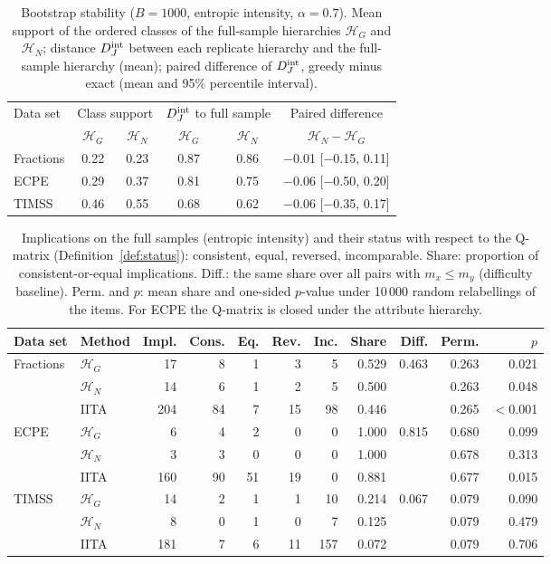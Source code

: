 \begin{table}[htbp]
	\centering
	\caption{Bootstrap stability ($B=1000$, entropic intensity, $\alpha=0.7$). Mean support of the ordered classes of the full-sample hierarchies $\mathcal H_G$ and $\mathcal H_N$; distance $D_J^{\rm int}$ between each replicate hierarchy and the full-sample hierarchy (mean); paired difference of $D_J^{\rm int}$, greedy minus exact (mean and 95\% percentile interval).}\label{tab:realstability}
	\small
	\setlength{\tabcolsep}{4pt}
	\begin{tabular}{lccccc}\toprule
		Data set & \multicolumn{2}{c}{Class support} & \multicolumn{2}{c}{$D_J^{\rm int}$ to full sample} & Paired difference\\ & $\mathcal H_G$ & $\mathcal H_N$ & $\mathcal H_G$ & $\mathcal H_N$ & $\mathcal H_N-\mathcal H_G$\\\midrule
		Fractions & 0.22 & 0.23 & 0.87 & 0.86 & $-$0.01 [$-$0.15, 0.11]\\
		ECPE & 0.29 & 0.37 & 0.81 & 0.75 & $-$0.06 [$-$0.50, 0.20]\\
		TIMSS & 0.46 & 0.55 & 0.68 & 0.62 & $-$0.06 [$-$0.35, 0.17]\\
		\bottomrule
	\end{tabular}
\end{table}

\begin{table}[htbp]
	\centering
	\caption{Implications on the full samples (entropic intensity) and their status with respect to the Q-matrix (Definition~\ref{def:status}): consistent, equal, reversed, incomparable. Share: proportion of consistent-or-equal implications. Diff.: the same share over all pairs with $m_x\leq m_y$ (difficulty baseline). Perm. and $p$: mean share and one-sided $p$-value under 10\,000 random relabellings of the items. For ECPE the Q-matrix is closed under the attribute hierarchy.}\label{tab:realvalidity}
	\small
	\setlength{\tabcolsep}{4pt}
	\begin{tabular}{llrrrrrrrrr}\toprule
		Data set & Method & Impl. & Cons. & Eq. & Rev. & Inc. & Share & Diff. & Perm. & $p$\\\midrule
		Fractions & $\mathcal H_G$ & 17 & 8 & 1 & 3 & 5 & 0.529 & 0.463 & 0.263 & 0.021\\
		 & $\mathcal H_N$ & 14 & 6 & 1 & 2 & 5 & 0.500 &  & 0.263 & 0.048\\
		 & IITA & 204 & 84 & 7 & 15 & 98 & 0.446 &  & 0.265 & $<$0.001\\
		\midrule
		ECPE & $\mathcal H_G$ & 6 & 4 & 2 & 0 & 0 & 1.000 & 0.815 & 0.680 & 0.099\\
		 & $\mathcal H_N$ & 3 & 3 & 0 & 0 & 0 & 1.000 &  & 0.678 & 0.313\\
		 & IITA & 160 & 90 & 51 & 19 & 0 & 0.881 &  & 0.677 & 0.015\\
		\midrule
		TIMSS & $\mathcal H_G$ & 14 & 2 & 1 & 1 & 10 & 0.214 & 0.067 & 0.079 & 0.090\\
		 & $\mathcal H_N$ & 8 & 0 & 1 & 0 & 7 & 0.125 &  & 0.079 & 0.479\\
		 & IITA & 181 & 7 & 6 & 11 & 157 & 0.072 &  & 0.079 & 0.706\\
		\bottomrule
	\end{tabular}
\end{table}

